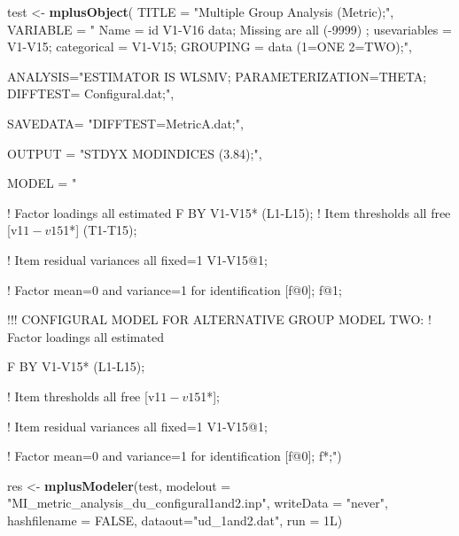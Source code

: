 \documentclass[]{book}
\newenvironment{Shaded}{\begin{snugshade}}{\end{snugshade}}
\newcommand{\DataTypeTok}[1]{\textcolor[rgb]{0.13,0.29,0.53}{#1}}
\newcommand{\KeywordTok}[1]{\textcolor[rgb]{0.13,0.29,0.53}{\textbf{#1}}}
\newcommand{\NormalTok}[1]{#1}
\newcommand{\OtherTok}[1]{\textcolor[rgb]{0.56,0.35,0.01}{#1}}
\newcommand{\StringTok}[1]{\textcolor[rgb]{0.31,0.60,0.02}{#1}}
\begin{document}
\begin{Shaded}
\begin{Highlighting}[]
\NormalTok{test <-}\StringTok{ }\KeywordTok{mplusObject}\NormalTok{(}
\DataTypeTok{TITLE =} \StringTok{"Multiple Group Analysis (Metric);"}\NormalTok{,}
\DataTypeTok{VARIABLE =} \StringTok{"}
\StringTok{Name = id V1-V16 data;}
\StringTok{Missing are all (-9999) ;}
\StringTok{usevariables = V1-V15;}
\StringTok{categorical = V1-V15;}
\StringTok{GROUPING = data (1=ONE 2=TWO);"}\NormalTok{,}

\DataTypeTok{ANALYSIS=}\StringTok{"ESTIMATOR IS WLSMV; }
\StringTok{PARAMETERIZATION=THETA;}
\StringTok{DIFFTEST= Configural.dat;"}\NormalTok{,}

\DataTypeTok{SAVEDATA=} \StringTok{"DIFFTEST=MetricA.dat;"}\NormalTok{,}

\DataTypeTok{OUTPUT =} \StringTok{"STDYX MODINDICES (3.84);"}\NormalTok{,}

\DataTypeTok{MODEL =} \StringTok{" }

\StringTok{! Factor loadings all estimated         }
\StringTok{ F BY V1-V15* (L1-L15);}
\StringTok{       }
\StringTok{! Item thresholds all free     }
\StringTok{[v1$1-v15$1*] (T1-T15);    }

\StringTok{! Item residual variances all fixed=1     }
\StringTok{V1-V15@1; }

\StringTok{! Factor mean=0 and variance=1 for identification }
\StringTok{[f@0]; f@1; }

\StringTok{!!! CONFIGURAL MODEL FOR ALTERNATIVE GROUP      }
\StringTok{MODEL TWO:  ! Factor loadings all estimated          }

\StringTok{ F BY V1-V15* (L1-L15);}

\StringTok{! Item thresholds all free     }
\StringTok{[v1$1-v15$1*]; }

\StringTok{! Item residual variances all fixed=1     }
\StringTok{V1-V15@1; }

\StringTok{! Factor mean=0 and variance=1 for identification }
\StringTok{[f@0]; f*;"}\NormalTok{)}

\NormalTok{res <-}\StringTok{ }\KeywordTok{mplusModeler}\NormalTok{(test, }\DataTypeTok{modelout =} \StringTok{"MI_metric_analysis_du_configural1and2.inp"}\NormalTok{, }
                    \DataTypeTok{writeData =} \StringTok{"never"}\NormalTok{, }
                    \DataTypeTok{hashfilename =} \OtherTok{FALSE}\NormalTok{, }
                    \DataTypeTok{dataout=}\StringTok{"ud_1and2.dat"}\NormalTok{, }\DataTypeTok{run =}\NormalTok{ 1L)}
\end{Highlighting}
\end{Shaded}
\end{document}
